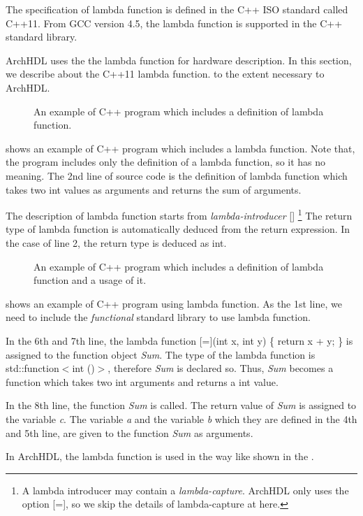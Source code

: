 The specification of lambda function is defined in the C++ ISO standard called C++11.
From GCC version 4.5, the lambda function is supported in the C++ standard library.

ArchHDL uses the the lambda function for hardware description.
In this section, we describe about the C++11 lambda function. to the extent necessary to ArchHDL.

\begin{figure}[t]
 
\caption{An example of C++ program which includes a definition of lambda function.}
 \label{src:def_lambda}
\end{figure}

 shows an example of C++ program which includes a lambda function.
Note that, the program includes only the definition of a lambda function, so it has no meaning.
The 2nd line of source code is the definition of lambda function which takes two int values as arguments and returns the sum of arguments.

The description of lambda function starts from \textit{lambda-introducer} [] \footnote{
A lambda introducer may contain a \textit{lambda-capture}.
ArchHDL only uses the option [=], so we skip the details of lambda-capture at here.
}
The return type of lambda function is automatically deduced from the return expression.
In the case of  line 2, the return type is deduced as int.

\begin{figure}[t]
 
 \caption{An example of C++ program which includes a definition of lambda function and a usage of it.}
 \label{src:ex_lambda}
\end{figure}

 shows an example of C++ program using lambda function.
As the 1st line, we need to include the \textit{functional} standard library to use lambda function.

In the 6th and 7th line, the lambda function [=](int x, int y) \{ return x + y; \} is assigned to the function object \textit{Sum}.
The type of the lambda function is std::function$<$int ()$>$, therefore \textit{Sum} is declared so.
Thus, \textit{Sum} becomes a function which takes two int arguments and returns a int value.

In the 8th line, the function \textit{Sum} is called.
The return value of \textit{Sum} is assigned to the variable \textit{c}.
The variable \textit{a} and the variable \textit{b} which they are defined in the 4th and 5th line, are given to the function \textit{Sum} as arguments.

In ArchHDL, the lambda function is used in the way like shown in the .
